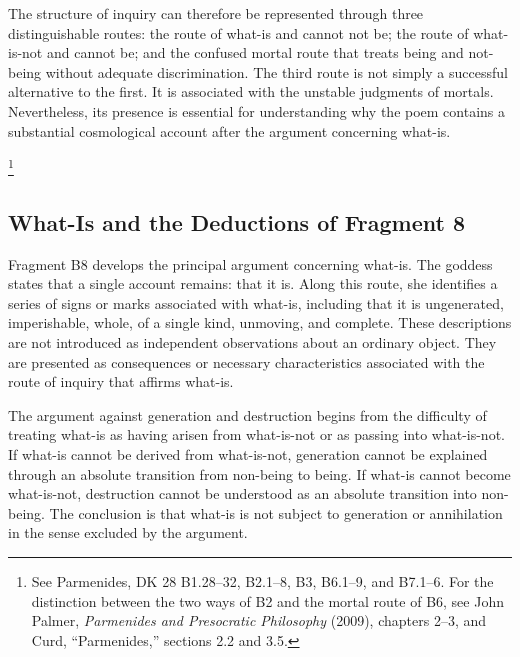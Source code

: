
The structure of inquiry can therefore be represented through
three distinguishable routes: the route of what-is and cannot
not be; the route of what-is-not and cannot be; and the
confused mortal route that treats being and not-being without
adequate discrimination. The third route is not simply a
successful alternative to the first. It is associated with
the unstable judgments of mortals. Nevertheless, its presence
is essential for understanding why the poem contains a
substantial cosmological account after the argument concerning
what-is.



\footnote{See Parmenides, DK 28 B1.28--32, B2.1--8, B3, B6.1--9,
and B7.1--6. For the distinction between the two ways of B2
and the mortal route of B6, see John Palmer, \textit{Parmenides
and Presocratic Philosophy} (2009), chapters 2--3, and Curd,
``Parmenides,'' sections 2.2 and 3.5.}


\subsection{What-Is and the Deductions of Fragment 8}


Fragment B8 develops the principal argument concerning what-is.
The goddess states that a single account remains: that it is.
Along this route, she identifies a series of signs or marks
associated with what-is, including that it is ungenerated,
imperishable, whole, of a single kind, unmoving, and complete.
These descriptions are not introduced as independent
observations about an ordinary object. They are presented
as consequences or necessary characteristics associated
with the route of inquiry that affirms what-is.


The argument against generation and destruction begins from
the difficulty of treating what-is as having arisen from
what-is-not or as passing into what-is-not. If what-is
cannot be derived from what-is-not, generation cannot
be explained through an absolute transition from non-being
to being. If what-is cannot become what-is-not, destruction
cannot be understood as an absolute transition into
non-being. The conclusion is that what-is is not subject
to generation or annihilation in the sense excluded
by the argument.

